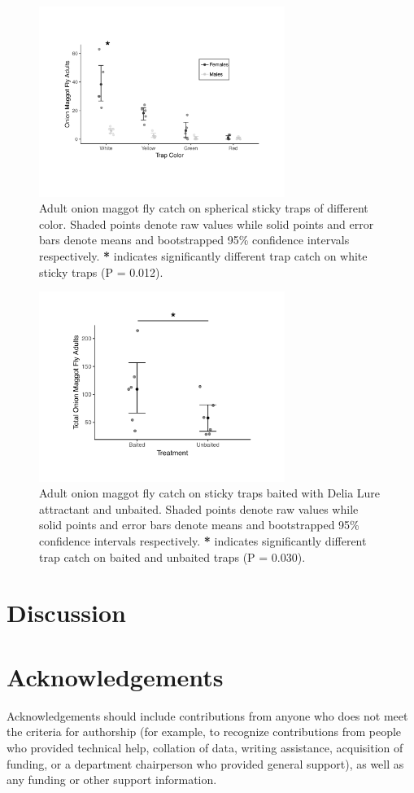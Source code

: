 \documentclass[alpha-refs]{wiley-article}
\begin{document}
\begin{figure}[bt]
\centering
\includegraphics[width = 8cm]{figures/publication/figure-3.pdf}
\caption{Adult onion maggot fly catch on spherical sticky traps of different color.  Shaded points denote raw values while solid points and error bars denote means and bootstrapped 95\% confidence intervals respectively.  \textbf{*} indicates significantly different trap catch on white sticky traps (P = 0.012).}
\label{fig:figure3}
\end{figure}


\begin{figure}[bt]
\centering
\includegraphics[width = 8cm]{figures/publication/figure-4.pdf}
\caption{Adult onion maggot fly catch on sticky traps baited with Delia Lure attractant and unbaited.  Shaded points denote raw values while solid points and error bars denote means and bootstrapped 95\% confidence intervals respectively.  \textbf{*} indicates significantly different trap catch on baited and unbaited traps (P = 0.030). }
\label{fig:figure4}
\end{figure}


\section{Discussion}

\section*{Acknowledgements}
Acknowledgements should include contributions from anyone who does not meet the criteria for authorship (for example, to recognize contributions from people who provided technical help, collation of data, writing assistance, acquisition of funding, or a department chairperson who provided general support), as well as any funding or other support information.
\end{document}
